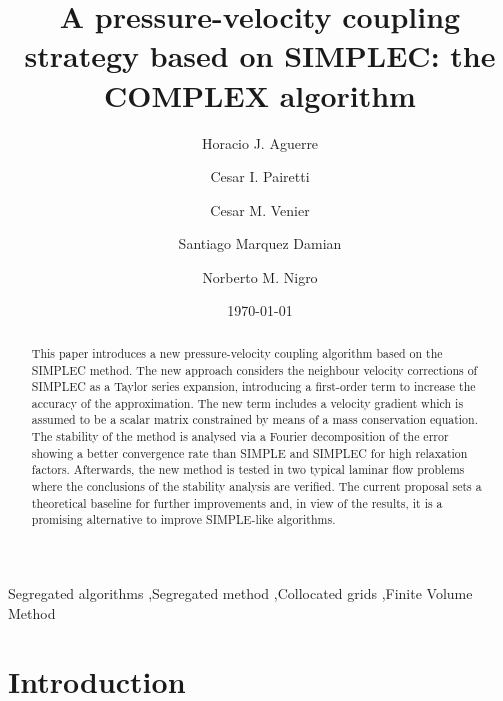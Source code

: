 \documentclass[final,3p,times,11pt,onecolumn]{myElsarticle}
\date{\today}
\numberwithin{equation}{section}
\begin{document}
\begin{frontmatter}

\title{A pressure-velocity coupling strategy based on SIMPLEC: the COMPLEX algorithm}
 
\author[a]{Horacio J. Aguerre}
\author[b,a]{Cesar I. Pairetti}
\author[a,b]{Cesar M. Venier}
\author[a,c]{Santiago Marquez Damian}
\author[a,d]{Norberto M. Nigro}

\address[a]{Centro de Investigación de Métodos Computacionales, CONICET-UNL, Santa Fe, Argentina}
\address[b]{Escuela de Ingenier\'ia Mec\'anica, Facultad de Ciencias Exactas, Ingenieria y Agrimensura, Universidad Nacional de Rosario, Rosario, Argentina}
\address[c]{Facultad Regional Santa Fe, Universidad Tecnologica Nacional, Santa Fe, Argentina}
\address[d]{Facultad de Ingeniería y Ciencias Hídricas, Universidad Nacional del Litoral, Santa Fe, Argentina}

\begin{abstract}
This paper introduces a new pressure-velocity coupling algorithm based on the SIMPLEC method. The new approach considers the neighbour velocity corrections of SIMPLEC as a Taylor series expansion, introducing a first-order term to increase the accuracy of the approximation. The new term includes a velocity gradient which is assumed to be a scalar matrix constrained by means of a mass conservation equation.
The stability of the method is analysed via a Fourier decomposition of the error showing a better convergence rate than SIMPLE and SIMPLEC for high relaxation factors. Afterwards, the new method is tested in two typical laminar flow problems where the conclusions of the stability analysis are verified. The current proposal sets a theoretical baseline for further improvements and, in view of the results, it is a promising alternative to improve SIMPLE-like algorithms.
\end{abstract}

\begin{keyword}
Segregated algorithms \sep Segregated method \sep Collocated grids \sep Finite Volume Method 
\end{keyword}
\end{frontmatter}

\section{Introduction}
\end{document}
